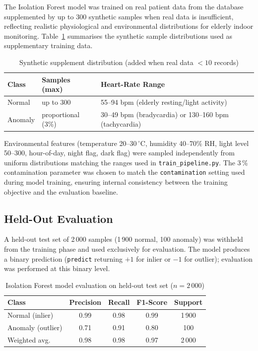 The Isolation Forest model was trained on real patient data from the database supplemented by up to 300 synthetic samples when real data is insufficient, reflecting realistic physiological and environmental distributions for elderly indoor monitoring. Table~\ref{tab:train_composition} summarises the synthetic sample distributions used as supplementary training data.

\begin{table}[ht]
\centering
\caption{Synthetic supplement distribution (added when real data $< 10$ records)}
\label{tab:train_composition}
\begin{tabular}{lll}
\toprule
\textbf{Class}  & \textbf{Samples (max)} & \textbf{Heart-Rate Range} \\
\midrule
Normal          & up to 300               & 55--94 bpm (elderly resting/light activity) \\
Anomaly         & proportional (3\%)      & 30--49 bpm (bradycardia) or 130--160 bpm (tachycardia) \\
\bottomrule
\end{tabular}
\end{table}

Environmental features (temperature 20--30\,$^\circ$C, humidity 40--70\% RH,
light level 50--300, hour-of-day, night flag, dark flag) were sampled
independently from uniform distributions matching the ranges used in \texttt{train\_pipeline.py}.
The 3\,\% contamination parameter was chosen to match the \texttt{contamination}
setting used during model training, ensuring internal consistency between the
training objective and the evaluation baseline.

\subsection{Held-Out Evaluation}

A held-out test set of 2\,000 samples (1\,900 normal, 100 anomaly) was
withheld from the training phase and used exclusively for evaluation. The model
produces a binary prediction (\texttt{predict} returning $+1$ for inlier or
$-1$ for outlier); evaluation was performed at this binary level.

\begin{table}[ht]
\centering
\caption{Isolation Forest model evaluation on held-out test set ($n = 2\,000$)}
\label{tab:ml_eval}
\begin{tabular}{lcccc}
\toprule
\textbf{Class}  & \textbf{Precision} & \textbf{Recall} & \textbf{F1-Score} & \textbf{Support} \\
\midrule
Normal (inlier)   & 0.99 & 0.98 & 0.99 & 1\,900 \\
Anomaly (outlier) & 0.71 & 0.91 & 0.80 & 100    \\
\midrule
Weighted avg.     & 0.98 & 0.98 & 0.97 & 2\,000 \\
\bottomrule
\end{tabular}
\end{table}

